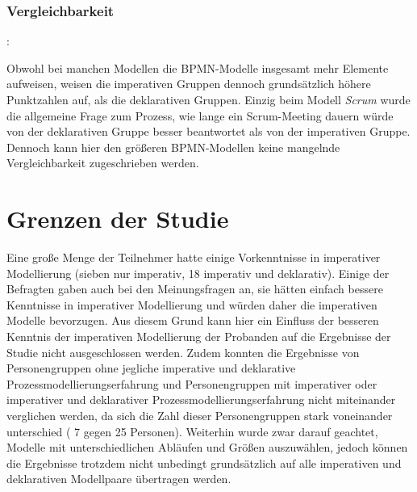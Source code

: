 \subsubsection{Vergleichbarkeit}: 

Obwohl bei manchen Modellen die BPMN-Modelle insgesamt mehr Elemente aufweisen, weisen die imperativen Gruppen dennoch grundsätzlich höhere Punktzahlen auf, als die deklarativen Gruppen. Einzig beim Modell \textit{Scrum} wurde die allgemeine Frage zum Prozess, wie lange ein Scrum-Meeting dauern würde von der deklarativen Gruppe besser beantwortet als von der imperativen Gruppe. Dennoch kann hier den größeren BPMN-Modellen keine mangelnde Vergleichbarkeit zugeschrieben werden.\newline



\section{Grenzen der Studie}

Eine große Menge der Teilnehmer hatte einige Vorkenntnisse in imperativer Modellierung (sieben nur imperativ, 18 imperativ und deklarativ). Einige der Befragten gaben auch bei den Meinungsfragen an, sie hätten einfach bessere Kenntnisse in imperativer Modellierung und würden daher die imperativen Modelle bevorzugen. Aus diesem Grund kann hier ein Einfluss der besseren Kenntnis der imperativen Modellierung der Probanden auf die Ergebnisse der Studie nicht ausgeschlossen werden. \newline 
Zudem konnten die Ergebnisse von Personengruppen ohne jegliche imperative und deklarative Prozessmodellierungserfahrung und Personengruppen mit imperativer oder imperativer und deklarativer Prozessmodellierungserfahrung nicht miteinander verglichen werden, da sich die Zahl dieser Personengruppen stark voneinander unterschied ( 7 gegen 25 Personen).\newline
Weiterhin wurde zwar darauf geachtet, Modelle mit unterschiedlichen Abläufen und Größen auszuwählen, jedoch können die Ergebnisse trotzdem nicht unbedingt grundsätzlich auf alle imperativen und deklarativen Modellpaare übertragen werden. \newline

 










